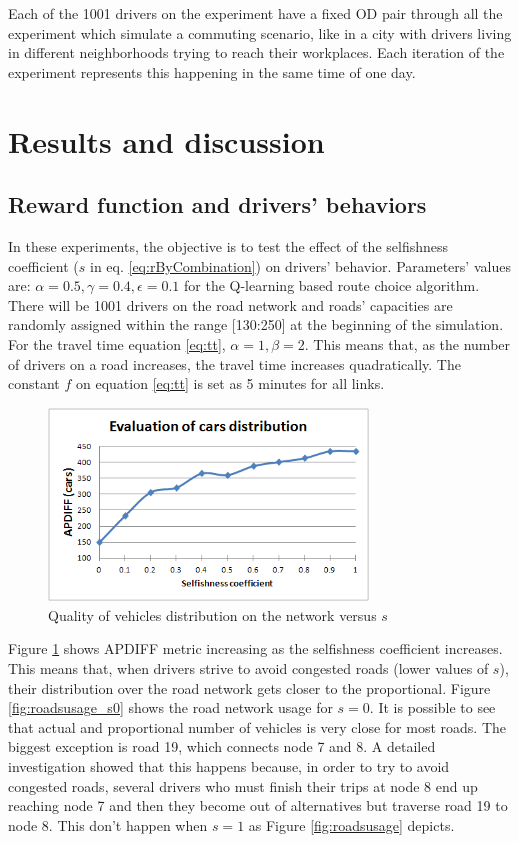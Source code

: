 \documentclass[12pt]{article}
\begin{document}
Each of the 1001 drivers on the experiment have a fixed OD pair through all the experiment which simulate a commuting scenario, like in a city with drivers living in different neighborhoods trying to reach their workplaces. Each iteration of the experiment represents this happening in the same time of one day.

\section{Results and discussion}
\label{sec:results}


\subsection{Reward function and drivers' behaviors}
In these experiments, the objective is to test the effect of the selfishness coefficient ($s$ in eq. \eqref{eq:rByCombination}) on drivers' behavior. Parameters' values are: $\alpha = 0.5, \gamma = 0.4, \epsilon = 0.1$ for the Q-learning based route choice algorithm. There will be 1001 drivers on the road network and roads' capacities are randomly assigned within the range [130:250] at the beginning of the simulation. For the travel time equation \eqref{eq:tt}, $\alpha = 1, \beta = 2$. This means that, as the number of drivers on a road increases, the travel time increases quadratically. The constant $f$ on equation \eqref{eq:tt} is set as 5 minutes for all links.

\begin{figure}[ht]
    \centerline{\includegraphics[width=8.5cm]{img/carsDistribVersusS.png}}
    \caption{Quality of vehicles distribution on the network versus $s$}
    \label{fig:apdiff}
\end{figure}

Figure \ref{fig:apdiff} shows APDIFF metric increasing as the selfishness coefficient increases. This means that, when drivers strive to avoid congested roads (lower values of $s$), their distribution over the road network gets closer to the proportional. Figure \ref{fig:roadsusage_s0} shows the road network usage for $s = 0$. It is possible to see that actual and proportional number of vehicles is very close for most roads. The biggest exception is road 19, which connects node 7 and 8. A detailed investigation showed that this happens because, in order to try to avoid congested roads, several drivers who must finish their trips at node 8 end up reaching node 7 and then they become out of alternatives but traverse road 19 to node 8. This don't happen when $s=1$ as Figure \ref{fig:roadsusage} depicts. 
\end{document}
